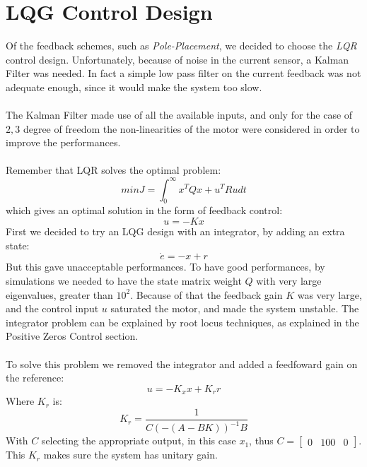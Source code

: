 \section{LQG Control Design}
Of the feedback schemes, such as \emph{Pole-Placement}, we decided to choose the \emph{LQR} control design. Unfortunately, because of noise in the current sensor, a Kalman Filter was needed. In fact a simple low pass filter on the current feedback was not adequate enough, since it would make the system too slow.\\ \\
The Kalman Filter made use of all the available inputs, and only for the case of $2,3$ degree of freedom the non-linearities of the motor were considered in order to improve the performances. \\ \\
Remember that LQR solves the optimal problem:
\begin{equation}
min J = \int_0^{\infty} x^T Q x + u^T R u dt
\end{equation}
which gives an optimal solution in the form of feedback control:
\begin{equation}
u=-Kx
\end{equation}
First we decided to try an LQG design with an integrator, by adding an extra state: 
\begin{equation}
\dot{e} = -x+r
\end{equation}
But this gave unacceptable performances. To have good performances, by simulations we needed to have the state matrix weight $Q$ with very large eigenvalues, greater than $10^2$. Because of that the feedback gain $K$ was very large, and the control input $u$ saturated the motor, and made the system unstable. The integrator problem can be explained by root locus techniques, as explained in the Positive Zeros Control section. \\ \\
To solve this problem we removed the integrator and added a feedfoward gain on the reference:
\begin{equation}
u=-K_{x} x+ K_{r} r
\end{equation}
Where $K_{r}$ is:
\begin{equation}
K_{r} = \frac{1}{C(-(A-BK))^{-1}B}
\end{equation}
With $C$ selecting the appropriate output, in this case $x_1$, thus $C=\begin{bmatrix}0 & 100 & 0\end{bmatrix}$. This $K_r$ makes sure the system has unitary gain. \\
